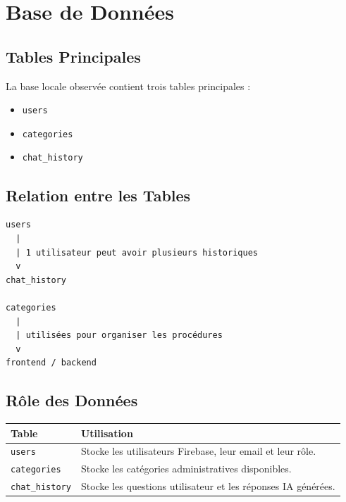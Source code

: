 \documentclass[12pt,a4paper]{report}
\begin{document}

\chapter{Base de Données}

\section{Tables Principales}

La base locale observée contient trois tables principales :

\begin{itemize}
    \item \texttt{users}
    \item \texttt{categories}
    \item \texttt{chat\_history}
\end{itemize}

\section{Relation entre les Tables}

\begin{verbatim}
users
  |
  | 1 utilisateur peut avoir plusieurs historiques
  v
chat_history

categories
  |
  | utilisées pour organiser les procédures
  v
frontend / backend
\end{verbatim}

\section{Rôle des Données}

\begin{longtable}{|p{4cm}|p{10cm}|}
\hline
\textbf{Table} & \textbf{Utilisation} \\
\hline
\endhead
\texttt{users} & Stocke les utilisateurs Firebase, leur email et leur rôle. \\
\hline
\texttt{categories} & Stocke les catégories administratives disponibles. \\
\hline
\texttt{chat\_history} & Stocke les questions utilisateur et les réponses IA générées. \\
\hline
\end{longtable}

\end{document}
